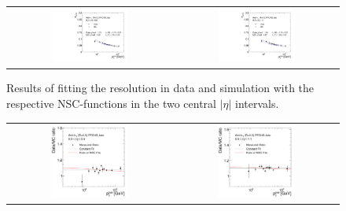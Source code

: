 \begin{description}
\begin{figure}[!p]
  \centering
  \begin{tabular}{cc}
                \includegraphics[width=0.49\textwidth]{figures/Pythia_NSCFit_Eta0_kNS_kC.pdf} &
                \includegraphics[width=0.49\textwidth]{figures/Pythia_NSCFit_Eta1_kNS_kC.pdf}\\
  \end{tabular}
  \caption{Results of fitting the resolution in data and simulation with the respective NSC-functions in the two central $|\eta|$ intervals.}
  \label{fig:NSC_Fits_3}
\end{figure} 
\begin{figure}[!p]
  \centering
  \begin{tabular}{cc}
                \includegraphics[width=0.49\textwidth]{figures/Pythia_NSCFit_Eta0_kNS_kC_ratio.pdf} &
                \includegraphics[width=0.49\textwidth]{figures/Pythia_NSCFit_Eta1_kNS_kC_ratio.pdf}\\

\end{tabular}
\end{figure}
\end{description}
